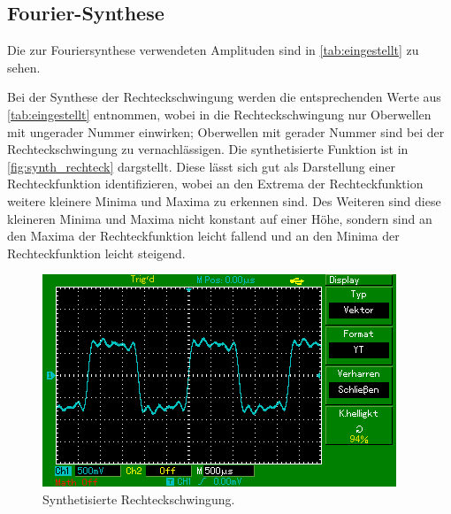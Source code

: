 \subsection{Fourier-Synthese}
Die zur Fouriersynthese verwendeten Amplituden sind in \autoref{tab:eingestellt} zu sehen. 

Bei der Synthese der Rechteckschwingung werden die entsprechenden Werte aus \autoref{tab:eingestellt} entnommen, wobei in die 
Rechteckschwingung nur Oberwellen mit ungerader Nummer einwirken; Oberwellen mit gerader Nummer sind bei der Rechteckschwingung
zu vernachlässigen. Die synthetisierte Funktion ist in \autoref{fig:synth_rechteck} dargstellt. Diese lässt sich gut als 
Darstellung einer Rechteckfunktion identifizieren, wobei an den Extrema der Rechteckfunktion weitere kleinere Minima und Maxima
zu erkennen sind. Des Weiteren sind diese kleineren Minima und Maxima nicht konstant auf einer Höhe, sondern sind an den 
Maxima der Rechteckfunktion leicht fallend und an den Minima der Rechteckfunktion leicht steigend. 
\begin{figure}
  \centering
  \includegraphics{content/MAP002.png}
  \caption{Synthetisierte Rechteckschwingung.}
  \label{fig:synth_rechteck}
\end{figure}

